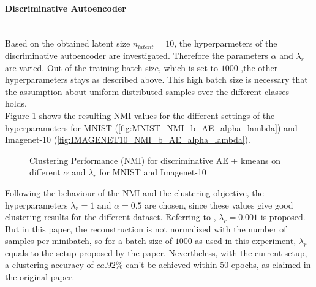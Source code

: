 \documentclass[12pt,DIV14,BCOR12mm,a4paper,footexclude,headinclude,halfparskip-,twoside,openright,cleardoubleempty,idxtotoc,bibtotoc,listtotoc]{scrreprt} %
\numberwithin{equation}{chapter}
\begin{document}
	\paragraph{Discriminative Autoencoder}\hfill \\
	Based on the obtained latent size $n_{latent} = 10$, the hyperparmeters of the discriminative autoencoder are investigated. Therefore the parameters $\alpha$ and $\lambda_r$ are varied. Out of the training batch size, which is set to $1000$ ,the other hyperparameters stays as described above. This high batch size is necessary that the assumption about uniform distributed samples over the different classes holds.
	\\Figure \ref{fig:ClusterPerformance_b_AE_Hyperparameters} shows the resulting NMI values for the different settings of the hyperparameters for MNIST (\ref{fig:MNIST_NMI_b_AE_alpha_lambda}) and Imagenet-10 (\ref{fig:IMAGENET10_NMI_b_AE_alpha_lambda}).
	\begin{figure}[htb!]
		\centering
		\qquad
		\caption{Clustering Performance (NMI) for discriminative AE + kmeans on different $\alpha$ and $\lambda_r$ for MNIST and Imagenet-10}
		\label{fig:ClusterPerformance_b_AE_Hyperparameters}
	\end{figure}
	Following the behaviour of the NMI and the clustering objective, the hyperparameters $\lambda_r = 1$ and $\alpha=0.5$ are chosen, since these values give good clustering results for the different dataset. Referring to \cite{DiscriminativeClustering}, $\lambda_r = 0.001$ is proposed. But in this paper, the reconstruction is not normalized with the number of samples per minibatch, so for a batch size of $1000$ as used in this experiment, $\lambda_r$ equals to the setup proposed by the paper. Nevertheless, with the current setup, a clustering accuracy of $ca. 92\%$ can't be achieved within 50 epochs, as claimed in the original paper.
\end{document}
